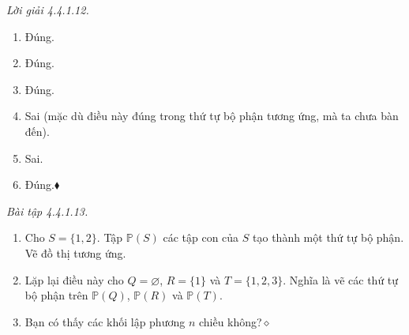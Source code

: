 \noindent\textit{Lời giải 4.4.1.12.}\keepwithnext
\begin{enumerate}[label=\alph*.]
\item Đúng.
\item Đúng.
\item Đúng.
\item Sai (mặc dù điều này đúng trong thứ tự bộ phận tương ứng, mà ta chưa bàn đến).
\item Sai.
\item Đúng.\nobreak\hfill$\blacklozenge$
\end{enumerate}

\noindent\textit{Bài tập 4.4.1.13.}\keepwithnext
\begin{enumerate}[label=\alph*.]
\item Cho $S=\{1,2\}$. Tập $\mathbb{P}(S)$ các tập con của $S$ tạo thành một thứ tự bộ phận. Vẽ đồ thị tương ứng.
\item Lặp lại điều này cho $Q=\varnothing$, $R=\{1\}$ và $T=\{1,2,3\}$. Nghĩa là vẽ các thứ tự bộ phận trên $\mathbb{P}(Q)$, $\mathbb{P}(R)$ và $\mathbb{P}(T)$.
\item Bạn có thấy các khối lập phương $n$ chiều không?\nobreak\hfill$\diamond$
\end{enumerate}

